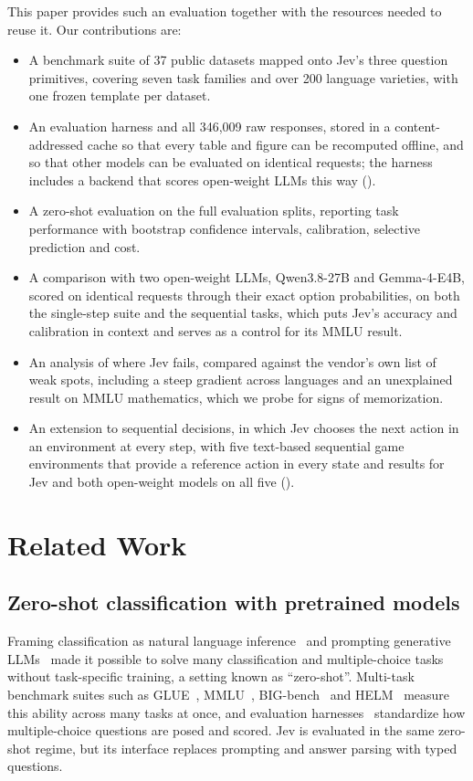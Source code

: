 \documentclass[table]{article}
\begin{document}
This paper provides such an evaluation together with the resources needed to reuse it. Our contributions are:
\begin{itemize}[leftmargin=*,noitemsep]
    \item A benchmark suite of 37 public datasets mapped onto Jev's three question primitives, covering seven task families and over 200 language varieties, with one frozen template per dataset.
    \item An evaluation harness and all 346{,}009 raw responses, stored in a content-addressed cache so that every table and figure can be recomputed offline, and so that other models can be evaluated on identical requests; the harness includes a backend that scores open-weight LLMs this way ().
    \item A zero-shot evaluation on the full evaluation splits, reporting task performance with bootstrap confidence intervals, calibration, selective prediction and cost.
    \item A comparison with two open-weight LLMs, Qwen3.8-27B and Gemma-4-E4B, scored on identical requests through their exact option probabilities, on both the single-step suite and the sequential tasks, which puts Jev's accuracy and calibration in context and serves as a control for its MMLU result.
    \item An analysis of where Jev fails, compared against the vendor's own list of weak spots, including a steep gradient across languages and an unexplained result on MMLU mathematics, which we probe for signs of memorization.
    \item An extension to sequential decisions, in which Jev chooses the next action in an environment at every step, with five text-based sequential game environments that provide a reference action in every state and results for Jev and both open-weight models on all five ().
\end{itemize}


\section{Related Work}

\subsection{Zero-shot classification with pretrained models}
Framing classification as natural language inference~\cite{yin2019zeroshot} and prompting generative LLMs~\cite{brown2020language} made it possible to solve many classification and multiple-choice tasks without task-specific training, a setting known as ``zero-shot''. Multi-task benchmark suites such as GLUE~\cite{wang-etal-2018-glue}, MMLU~\cite{hendrycks2021measuringmassivemultitasklanguage}, BIG-bench~\cite{srivastava2023beyond} and HELM~\cite{liang2023holistic} measure this ability across many tasks at once, and evaluation harnesses~\cite{biderman2026lessonstrenchesreproducibleevaluation} standardize how multiple-choice questions are posed and scored. Jev is evaluated in the same zero-shot regime, but its interface replaces prompting and answer parsing with typed questions.
\end{document}
